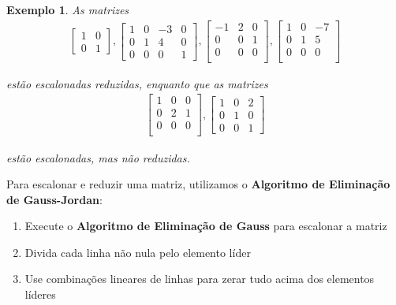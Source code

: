 \documentclass{article}
\newtheorem*{example}{Exemplo}
\begin{document}
\begin{example}
	As matrizes
	\begin{align*}
	\begin{bmatrix}
	1 & 0 \\
	0 & 1
	\end{bmatrix}, 
	\begin{bmatrix}
	1 & 0 & -3 & 0 \\
	0 & 1 & 4 & 0 \\
	0 & 0 & 0 & 1
	\end{bmatrix}, 
	\begin{bmatrix}
	-1 & 2 & 0 \\
	0 & 0 & 1 \\
	0 & 0 & 0 \\
	\end{bmatrix}, 
	\begin{bmatrix}
	1 & 0 & -7 \\
	0 & 1 & 5 \\
	0 & 0 & 0 \\
	\end{bmatrix}
	\end{align*}
	\par\vspace{0.3cm} estão escalonadas reduzidas, enquanto que as matrizes
	\begin{align*}
	\begin{bmatrix}
	1 & 0 & 0 \\
	0 & 2 & 1 \\
	0 & 0 & 0 \\
	\end{bmatrix}, 
	\begin{bmatrix}
	1 & 0 & 2 \\
	0 & 1 & 0 \\
	0 & 0 & 1 
	\end{bmatrix}
	\end{align*}
	\par\vspace{0.3cm} estão escalonadas, mas não reduzidas.
\end{example}
\par\vspace{0.3cm} Para escalonar e reduzir uma matriz, utilizamos o \textbf{Algoritmo de Eliminação de Gauss-Jordan}:
\begin{enumerate}
	\item Execute o \textbf{Algoritmo de Eliminação de Gauss} para escalonar a matriz
	\item Divida cada linha não nula pelo elemento líder
	\item Use combinações lineares de linhas para zerar tudo acima dos elementos líderes
\end{enumerate}
\end{document}
